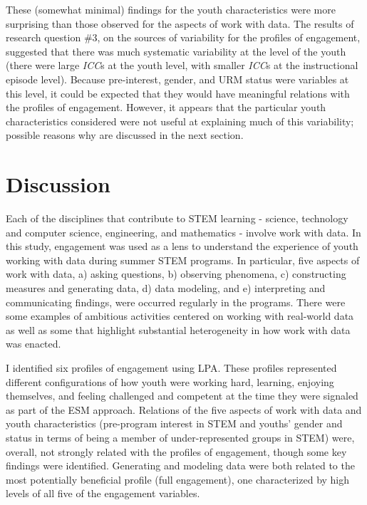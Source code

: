 \documentclass[]{msu-thesis}
\theoremstyle{definition}
\theoremstyle{definition}
\theoremstyle{definition}
\theoremstyle{remark}
\begin{document}
These (somewhat minimal) findings for the youth characteristics were
more surprising than those observed for the aspects of work with data.
The results of research question \#3, on the sources of variability for
the profiles of engagement, suggested that there was much systematic
variability at the level of the youth (there were large \emph{ICC}s at
the youth level, with smaller \emph{ICC}s at the instructional episode
level). Because pre-interest, gender, and URM status were variables at
this level, it could be expected that they would have meaningful
relations with the profiles of engagement. However, it appears that the
particular youth characteristics considered were not useful at
explaining much of this variability; possible reasons why are discussed
in the next section.

\chapter{Discussion}\label{discussion}

Each of the disciplines that contribute to STEM learning - science,
technology and computer science, engineering, and mathematics - involve
work with data. In this study, engagement was used as a lens to
understand the experience of youth working with data during summer STEM
programs. In particular, five aspects of work with data, a) asking
questions, b) observing phenomena, c) constructing measures and
generating data, d) data modeling, and e) interpreting and communicating
findings, were occurred regularly in the programs. There were some
examples of ambitious activities centered on working with real-world
data as well as some that highlight substantial heterogeneity in how
work with data was enacted.

I identified six profiles of engagement using LPA. These profiles
represented different configurations of how youth were working hard,
learning, enjoying themselves, and feeling challenged and competent at
the time they were signaled as part of the ESM approach. Relations of
the five aspects of work with data and youth characteristics
(pre-program interest in STEM and youths' gender and status in terms of
being a member of under-represented groups in STEM) were, overall, not
strongly related with the profiles of engagement, though some key
findings were identified. Generating and modeling data were both related
to the most potentially beneficial profile (full engagement), one
characterized by high levels of all five of the engagement variables.
\end{document}
